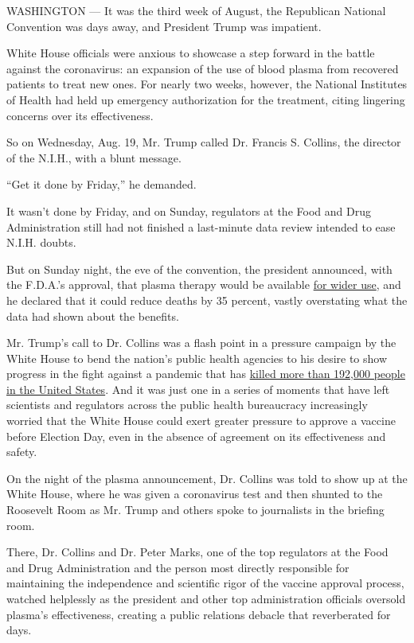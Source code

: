 WASHINGTON --- It was the third week of August, the Republican National
Convention was days away, and President Trump was impatient.

White House officials were anxious to showcase a step forward in the
battle against the coronavirus: an expansion of the use of blood plasma
from recovered patients to treat new ones. For nearly two weeks,
however, the National Institutes of Health had held up emergency
authorization for the treatment, citing lingering concerns over its
effectiveness.

So on Wednesday, Aug. 19, Mr. Trump called Dr. Francis S. Collins, the
director of the N.I.H., with a blunt message.

``Get it done by Friday,'' he demanded.

It wasn't done by Friday, and on Sunday, regulators at the Food and Drug
Administration still had not finished a last-minute data review intended
to ease N.I.H. doubts.

But on Sunday night, the eve of the convention, the president announced,
with the F.D.A.'s approval, that plasma therapy would be available
\href{https://www.nytimes3xbfgragh.onion/2020/08/23/us/politics/fda-plasma-coronavirus.html}{for
wider use}, and he declared that it could reduce deaths by 35 percent,
vastly overstating what the data had shown about the benefits.

Mr. Trump's call to Dr. Collins was a flash point in a pressure campaign
by the White House to bend the nation's public health agencies to his
desire to show progress in the fight against a pandemic that has
\href{https://www.nytimes3xbfgragh.onion/interactive/2020/us/coronavirus-us-cases.html}{killed
more than 192,000 people in the United States}. And it was just one in a
series of moments that have left scientists and regulators across the
public health bureaucracy increasingly worried that the White House
could exert greater pressure to approve a vaccine before Election Day,
even in the absence of agreement on its effectiveness and safety.

On the night of the plasma announcement, Dr. Collins was told to show up
at the White House, where he was given a coronavirus test and then
shunted to the Roosevelt Room as Mr. Trump and others spoke to
journalists in the briefing room.

There, Dr. Collins and Dr. Peter Marks, one of the top regulators at the
Food and Drug Administration and the person most directly responsible
for maintaining the independence and scientific rigor of the vaccine
approval process, watched helplessly as the president and other top
administration officials oversold plasma's effectiveness, creating a
public relations debacle that reverberated for days.

